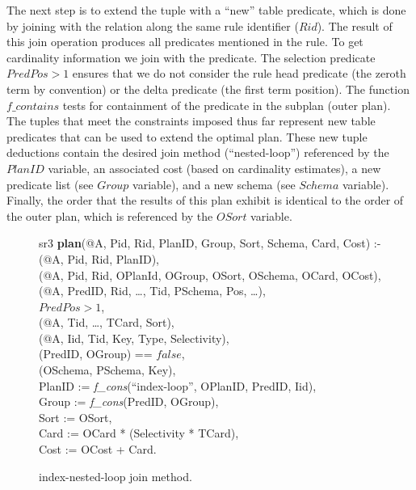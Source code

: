 The next step is to extend the  tuple with a ``new'' table predicate,
which is done by joining with the  relation along the same
rule identifier ($Rid$).  The result of this join operation produces all
predicates mentioned in the rule.  To get cardinality information we join with
the  predicate.  The selection predicate $PredPos > 1$ ensures
that we do not consider the rule head predicate (the zeroth term by convention)
or the delta predicate (the first term position).  The function $f\_contains$
tests for containment of the predicate in the subplan (outer plan).  The tuples
that meet the constraints imposed thus far represent new table predicates that
can be used to extend the optimal plan.  These new  tuple deductions
contain the desired join method (``nested-loop'') referenced by the $PlanID$
variable, an associated cost (based on cardinality estimates), a new predicate
list (see $Group$ variable), and a new schema (see $Schema$ variable).
Finally, the order that the results of this plan exhibit is identical to
the order of the outer plan, which is referenced by the $OSort$ variable.

\begin{figure*}
\ssp
\centering
\begin{boxedminipage}{\linewidth}

sr3 {\bf plan}(@A, Pid, Rid, PlanID, Group, Sort, Schema, Card, Cost) :- \\
(@A, Pid, Rid, PlanID),\\
(@A, Pid, Rid, OPlanId, OGroup, OSort, OSchema, OCard, OCost), \\
(@A, PredID, Rid, \ldots, Tid, PSchema, Pos, \ldots), \\
\datalogspace $PredPos > 1$,\\
(@A, Tid, \ldots, TCard, Sort),\\
(@A, Iid, Tid, Key, Type, Selectivity),\\
(PredID, OGroup) == $false$,\\
(OSchema, PSchema, Key),\\
\datalogspace PlanID := {\em f\_cons}(``index-loop'', OPlanID, PredID, Iid),\\
\datalogspace Group := {\em f\_cons}(PredID, OGroup),\\
\datalogspace Sort := OSort, \\
\datalogspace Card   := OCard * (Selectivity * TCard),\\
\datalogspace Cost   := OCost + Card.

\end{boxedminipage}
\caption{\label{ch:opt:fig:plangen2}index-nested-loop join method.}
\end{figure*}


